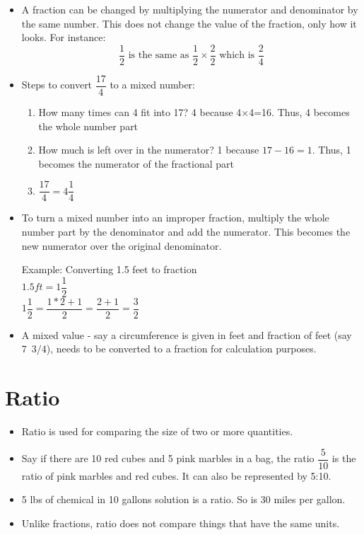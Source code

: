\begin{itemize}
\item A fraction can be changed by multiplying the numerator and denominator by the same number. This does not change the value of the fraction, only how it looks. For instance:
$$
\dfrac{1}{2} \text { is the same as } \dfrac{1}{2} \times \dfrac{2}{2} \text { which is } \dfrac{2}{4}
$$

\item Steps to convert $\dfrac{17}{4}$ to a mixed number:
\begin{enumerate}[Step 1.]
\item How many times can 4 fit into 17? 4 because 4×4=16.  Thus, 4 becomes the whole number part
\item How much is left over in the numerator? 1 because $17-16=1$.  Thus, 1 becomes the numerator of the fractional part
\item $\dfrac{17}{4} = 4\dfrac{1}{4}$
\end{enumerate}
\vspace{0.2cm}
\item To turn a mixed number into an improper fraction, multiply the whole number part by the denominator and add the numerator. This becomes the new numerator over the original denominator.

Example: Converting 1.5 feet to fraction\\
$1.5ft=1\dfrac{1}{2}$\\
\vspace{0.2cm}
$1\dfrac{1}{2}=\dfrac{1*2+1}{2}=\dfrac{2+1}{2}=\dfrac{3}{2}$
\vspace{0.2cm}
\item A mixed value - say a circumference is given in feet and fraction of feet (say $7 \enspace 3/4$), needs to be converted to a fraction for calculation purposes.
\end{itemize}

\newpage
\section{Ratio}
\begin{itemize}
\item Ratio is used for comparing the size of two or more quantities.
\item Say if there are 10 red cubes and 5 pink marbles in a bag, the ratio $\dfrac{5}{10}$ is the ratio of pink marbles and red cubes.  It can also be represented by 5:10.
\item 5 lbs of chemical in 10 gallons solution is a ratio.  So is 30 miles per gallon.
\item Unlike fractions, ratio does not compare things that have the same units.
\end{itemize}
